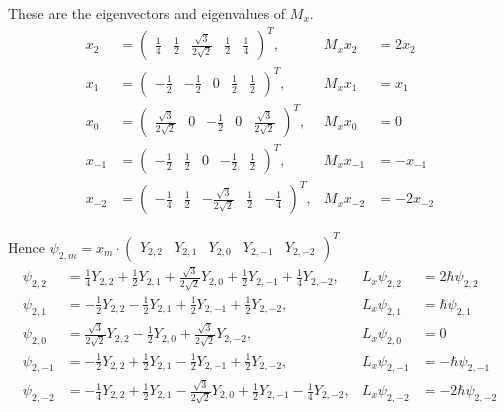 These are the eigenvectors and eigenvalues of $M_x$.
\begin{align*}
x_2&=\begin{pmatrix}
\frac{1}{4} & \frac{1}{2} & \frac{\sqrt3}{2\sqrt2} & \frac{1}{2} & \frac{1}{4}
\end{pmatrix}^T, & M_xx_2&=2x_2
\\[1ex]
x_1&=\begin{pmatrix}
-\frac{1}{2} & -\frac{1}{2} & 0 & \frac{1}{2} & \frac{1}{2}
\end{pmatrix}^T, & M_xx_1&=x_1
\\[1ex]
x_0&=\begin{pmatrix}
\frac{\sqrt3}{2\sqrt2} & 0 & -\frac{1}{2} & 0 & \frac{\sqrt3}{2\sqrt2}
\end{pmatrix}^T, & M_xx_0&=0
\\[1ex]
x_{-1}&=\begin{pmatrix}
-\frac{1}{2} & \frac{1}{2} & 0 & -\frac{1}{2} & \frac{1}{2}
\end{pmatrix}^T, & M_xx_{-1}&=-x_{-1}
\\[1ex]
x_{-2}&=\begin{pmatrix}
-\frac{1}{4} & \frac{1}{2} & -\frac{\sqrt3}{2\sqrt2} & \frac{1}{2} & -\frac{1}{4}
\end{pmatrix}^T, & M_xx_{-2}&=-2x_{-2}
\end{align*}

Hence $\psi_{2,m}=x_m\cdot\begin{pmatrix}Y_{2,2} & Y_{2,1} & Y_{2,0} & Y_{2,-1} & Y_{2,-2}\end{pmatrix}^T$
\begin{align*}
\psi_{2,2}&=\frac{1}{4}Y_{2,2}+\frac{1}{2}Y_{2,1}+\frac{\sqrt3}{2\sqrt2}Y_{2,0}
+\frac{1}{2}Y_{2,-1}+\frac{1}{4}Y_{2,-2}, & L_x\psi_{2,2}&=2\hbar\psi_{2,2}
\\[1ex]
\psi_{2,1}&=-\frac{1}{2}Y_{2,2}-\frac{1}{2}Y_{2,1}
+\frac{1}{2}Y_{2,-1}+\frac{1}{2}Y_{2,-2}, & L_x\psi_{2,1}&=\hbar\psi_{2,1}
\\[1ex]
\psi_{2,0}&=\frac{\sqrt3}{2\sqrt2}Y_{2,2}
-\frac{1}{2}Y_{2,0}+\frac{\sqrt3}{2\sqrt2}Y_{2,-2}, & L_x\psi_{2,0}&=0
\\[1ex]
\psi_{2,-1}&=-\frac{1}{2}Y_{2,2}+\frac{1}{2}Y_{2,1}
-\frac{1}{2}Y_{2,-1}+\frac{1}{2}Y_{2,-2}, & L_x\psi_{2,-1}&=-\hbar\psi_{2,-1}
\\[1ex]
\psi_{2,-2}&=-\frac{1}{4}Y_{2,2}+\frac{1}{2}Y_{2,1}-\frac{\sqrt3}{2\sqrt2}Y_{2,0}
+\frac{1}{2}Y_{2,-1}-\frac{1}{4}Y_{2,-2}, & L_x\psi_{2,-2}&=-2\hbar\psi_{2,-2}
\end{align*}


